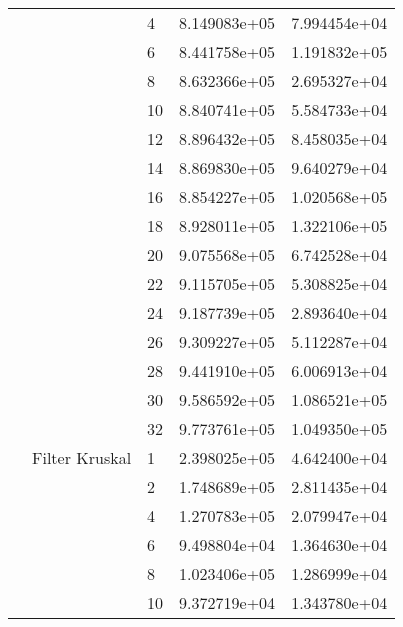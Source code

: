 \begin{tabular}{lllrr}
                       &                    & 4  &  8.149083e+05 &  7.994454e+04 \\
                       &                    & 6  &  8.441758e+05 &  1.191832e+05 \\
                       &                    & 8  &  8.632366e+05 &  2.695327e+04 \\
                       &                    & 10 &  8.840741e+05 &  5.584733e+04 \\
                       &                    & 12 &  8.896432e+05 &  8.458035e+04 \\
                       &                    & 14 &  8.869830e+05 &  9.640279e+04 \\
                       &                    & 16 &  8.854227e+05 &  1.020568e+05 \\
                       &                    & 18 &  8.928011e+05 &  1.322106e+05 \\
                       &                    & 20 &  9.075568e+05 &  6.742528e+04 \\
                       &                    & 22 &  9.115705e+05 &  5.308825e+04 \\
                       &                    & 24 &  9.187739e+05 &  2.893640e+04 \\
                       &                    & 26 &  9.309227e+05 &  5.112287e+04 \\
                       &                    & 28 &  9.441910e+05 &  6.006913e+04 \\
                       &                    & 30 &  9.586592e+05 &  1.086521e+05 \\
                       &                    & 32 &  9.773761e+05 &  1.049350e+05 \\
                       & Filter Kruskal & 1  &  2.398025e+05 &  4.642400e+04 \\
                       &                    & 2  &  1.748689e+05 &  2.811435e+04 \\
                       &                    & 4  &  1.270783e+05 &  2.079947e+04 \\
                       &                    & 6  &  9.498804e+04 &  1.364630e+04 \\
                       &                    & 8  &  1.023406e+05 &  1.286999e+04 \\
                       &                    & 10 &  9.372719e+04 &  1.343780e+04 \\

\end{tabular}
